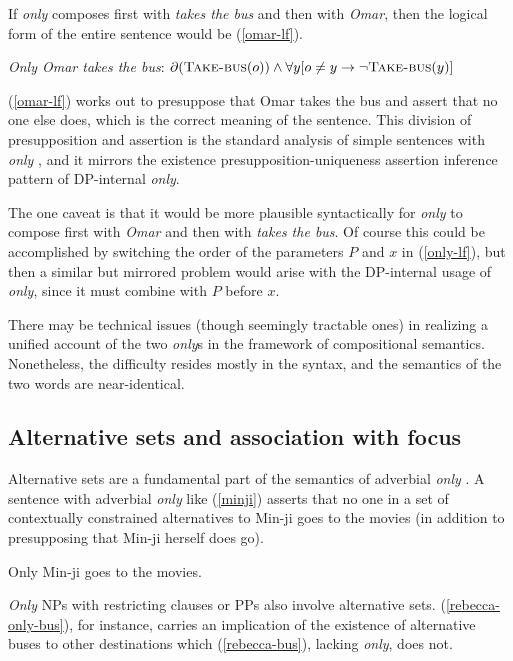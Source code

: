 If \textit{only} composes first with \textit{takes the bus} and then with \textit{Omar}, then the logical form of the entire sentence would be (\ref{omar-lf}).

\begin{exe}
	\ex \label{omar-lf} \textit{Only Omar takes the bus}: $\partial(\textsc{Take-bus}(o)) \land \forall y [ o \ne y \to \neg \textsc{Take-bus}(y) ]$
\end{exe}

(\ref{omar-lf}) works out to presuppose that Omar takes the bus and assert that no one else does, which is the correct meaning of the sentence. This division of presupposition and assertion is the standard analysis of simple sentences with \textit{only} \citep{horn69}, and it mirrors the existence presupposition-uniqueness assertion inference pattern of DP-internal \textit{only}.

The one caveat is that it would be more plausible syntactically for \textit{only} to compose first with \textit{Omar} and then with \textit{takes the bus}. Of course this could be accomplished by switching the order of the parameters $P$ and $x$ in (\ref{only-lf}), but then a similar but mirrored problem would arise with the DP-internal usage of \textit{only}, since it must combine with $P$ before $x$.

There may be technical issues (though seemingly tractable ones) in realizing a unified account of the two \textit{only}s in the framework of compositional semantics. Nonetheless, the difficulty resides mostly in the syntax, and the semantics of the two words are near-identical.

\subsection{Alternative sets and association with focus}
Alternative sets are a fundamental part of the semantics of adverbial \textit{only} \citep{rooth85, rooth92}. A sentence with adverbial \textit{only} like (\ref{minji}) asserts that no one in a set of contextually constrained alternatives to Min-ji goes to the movies (in addition to presupposing that Min-ji herself does go).

\begin{exe}
	\ex \label{minji} Only Min-ji goes to the movies.
\end{exe}

\textit{Only} NPs with restricting clauses or PPs also involve alternative sets. (\ref{rebecca-only-bus}), for instance, carries an implication of the existence of alternative buses to other destinations which (\ref{rebecca-bus}), lacking \textit{only}, does not.

